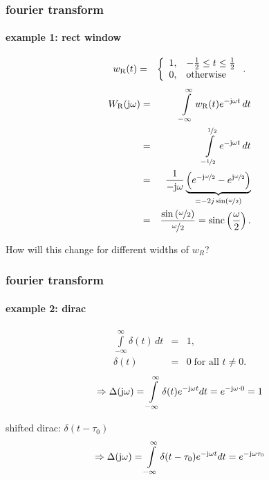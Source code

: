 	\begin{frame}\frametitle{fourier transform}\framesubtitle{example 1: rect window}
        \vspace{-8mm}
        \begin{footnotesize}
        \begin{eqnarray}
            w_{\mathrm{R}}(t)	&=& \left\lbrace  
                        \begin{array}{ll} 
                                                    1, & -\frac{1}{2} \leq t \leq \frac{1}{2}\\ 
                          \vphantom{\frac{1}{1}} 	0, & \text{otherwise} \\ 
                        \end{array} 
                        \right. .
        \end{eqnarray}
\pause
        \begin{eqnarray}
            W_{\mathrm{R}}(\mathrm{j}\omega) 	&=& \int\limits_{-\infty}^{\infty} {w_{\mathrm{R}}(t){e}^{-\mathrm{j}\omega t}\,dt}\nonumber\\
                        &=& \int\limits_{-\nicefrac{1}{2}}^{\nicefrac{1}{2}} {{e}^{-\mathrm{j}\omega t}\,dt}\nonumber\\
                        &=& \frac{1}{-\mathrm{j}\omega} \underbrace{\left({e}^{-\mathrm{j}\nicefrac{\omega}{2}}-{e}^{\mathrm{j}\nicefrac{\omega}{2}}\right)}_{= -2j\sin\left(\nicefrac{\omega}{2}\right)}\nonumber\\
                        &=& \frac{\sin\left(\nicefrac{\omega}{2}\right)}{\nicefrac{\omega}{2}} = \operatorname*{sinc}\left(\frac{\omega}{2}\right) .
        \end{eqnarray}
        \end{footnotesize}
        \pause
        
        How will this change for different widths of $w_R$?
	\end{frame}	

	\begin{frame}\frametitle{fourier transform}\framesubtitle{example 2: dirac}
        \begin{eqnarray*} %
            \int\limits_{-\infty}^{\infty} \delta(t)\, dt &=& 1\label{eq:dirac_int} ,\\
            \delta(t) &=& 0\; \text{for all } t\neq 0 .
        \end{eqnarray*}
        \pause
        \begin{equation*}
            \Rightarrow \Delta(\mathrm{j}\omega) = \int\limits_{-\infty}^\infty \delta(t)e^{-\mathrm{j}\omega t}dt = e^{-\mathrm{j}\omega \cdot 0} = 1
        \end{equation*}
        \pause
        
        \bigskip
        shifted dirac: $\delta(t-\tau_0)$
         \begin{equation*}
            \Rightarrow \Delta(\mathrm{j}\omega) = \int\limits_{-\infty}^\infty \delta(t-\tau_0)e^{-\mathrm{j}\omega t}dt = e^{-\mathrm{j}\omega \tau_0}
        \end{equation*}
   \end{frame}	

